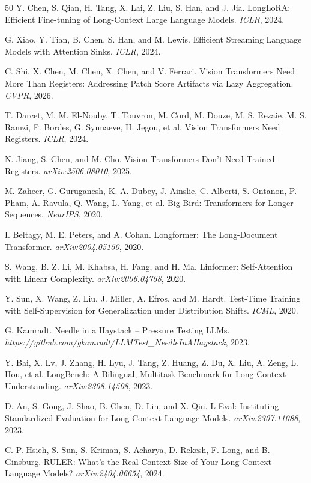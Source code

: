 \documentclass[twocolumn]{article}
\begin{document}
\begin{thebibliography}{50}
Y. Chen, S. Qian, H. Tang, X. Lai, Z. Liu, S. Han, and J. Jia. LongLoRA: Efficient Fine-tuning of Long-Context Large Language Models. \emph{ICLR}, 2024.

G. Xiao, Y. Tian, B. Chen, S. Han, and M. Lewis. Efficient Streaming Language Models with Attention Sinks. \emph{ICLR}, 2024.

C. Shi, X. Chen, M. Chen, X. Chen, and V. Ferrari. Vision Transformers Need More Than Registers: Addressing Patch Score Artifacts via Lazy Aggregation. \emph{CVPR}, 2026.

T. Darcet, M. M. El-Nouby, T. Touvron, M. Cord, M. Douze, M. S. Rezaie, M. S. Ramzi, F. Bordes, G. Synnaeve, H. Jegou, et al. Vision Transformers Need Registers. \emph{ICLR}, 2024.

N. Jiang, S. Chen, and M. Cho. Vision Transformers Don't Need Trained Registers. \emph{arXiv:2506.08010}, 2025.

M. Zaheer, G. Guruganesh, K. A. Dubey, J. Ainslie, C. Alberti, S. Ontanon, P. Pham, A. Ravula, Q. Wang, L. Yang, et al. Big Bird: Transformers for Longer Sequences. \emph{NeurIPS}, 2020.

I. Beltagy, M. E. Peters, and A. Cohan. Longformer: The Long-Document Transformer. \emph{arXiv:2004.05150}, 2020.

S. Wang, B. Z. Li, M. Khabsa, H. Fang, and H. Ma. Linformer: Self-Attention with Linear Complexity. \emph{arXiv:2006.04768}, 2020.

Y. Sun, X. Wang, Z. Liu, J. Miller, A. Efros, and M. Hardt. Test-Time Training with Self-Supervision for Generalization under Distribution Shifts. \emph{ICML}, 2020.

G. Kamradt. Needle in a Haystack -- Pressure Testing LLMs. \emph{https://github.com/gkamradt/LLMTest\_NeedleInAHaystack}, 2023.

Y. Bai, X. Lv, J. Zhang, H. Lyu, J. Tang, Z. Huang, Z. Du, X. Liu, A. Zeng, L. Hou, et al. LongBench: A Bilingual, Multitask Benchmark for Long Context Understanding. \emph{arXiv:2308.14508}, 2023.

D. An, S. Gong, J. Shao, B. Chen, D. Lin, and X. Qiu. L-Eval: Instituting Standardized Evaluation for Long Context Language Models. \emph{arXiv:2307.11088}, 2023.

C.-P. Hsieh, S. Sun, S. Kriman, S. Acharya, D. Rekesh, F. Long, and B. Ginsburg. RULER: What's the Real Context Size of Your Long-Context Language Models? \emph{arXiv:2404.06654}, 2024.


\end{thebibliography}
\end{document}
